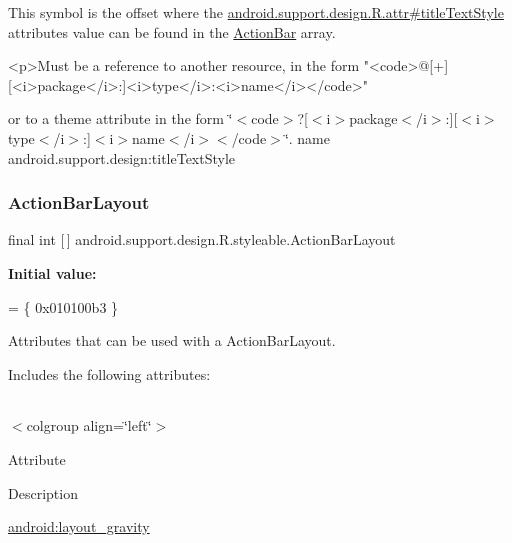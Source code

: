 This symbol is the offset where the \hyperlink{classandroid_1_1support_1_1design_1_1R_1_1attr_a826c283648de1009c659c577c61a5f2f}{android.\+support.\+design.\+R.\+attr\#title\+Text\+Style} attribute\textquotesingle{}s value can be found in the \hyperlink{classandroid_1_1support_1_1design_1_1R_1_1styleable_ab795220a96557d11f8c21359b95bed82}{Action\+Bar} array.

\begin{DoxyVerb}      <p>Must be a reference to another resource, in the form "<code>@[+][<i>package</i>:]<i>type</i>:<i>name</i></code>"
\end{DoxyVerb}
 or to a theme attribute in the form \char`\"{}$<$code$>$?\mbox{[}$<$i$>$package$<$/i$>$\+:\mbox{]}\mbox{[}$<$i$>$type$<$/i$>$\+:\mbox{]}$<$i$>$name$<$/i$>$$<$/code$>$\char`\"{}.  name android.\+support.\+design\+:title\+Text\+Style \mbox{\label{classandroid_1_1support_1_1design_1_1R_1_1styleable_a0836ebb5f737b4f92fdf54e3c8fee963}} 
\subsubsection{\texorpdfstring{Action\+Bar\+Layout}{ActionBarLayout}}
{\footnotesize\ttfamily final int \mbox{[}$\,$\mbox{]} android.\+support.\+design.\+R.\+styleable.\+Action\+Bar\+Layout\hspace{0.3cm}{\ttfamily [static]}}

{\bfseries Initial value\+:}
\begin{DoxyCode}
= \{
            0x010100b3
        \}
\end{DoxyCode}
Attributes that can be used with a Action\+Bar\+Layout. 

Includes the following attributes\+:

\tabulinesep=1mm
\begin{longtabu} spread 0pt [c]{*{0}{|X[-1]}|}
\hline
\end{longtabu}
$<$colgroup align=\char`\"{}left\char`\"{}$>$ 

Attribute

Description 

{\ttfamily \hyperlink{classandroid_1_1support_1_1design_1_1R_1_1styleable_ab46b09d66931dd9a9d75f86ffac54800}{android\+:layout\+\_\+gravity}}

